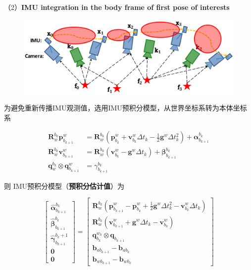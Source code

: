 \documentclass[12pt,a4paper]{article}
\begin{document}
（2）\textbf{IMU integration in the body frame of first pose of interests}

\begin{figure}[htbp]
\centering
\includegraphics[scale=0.6]{images/imu_integration_02.png}
\end{figure}

为避免重新传播IMU观测值，选用IMU预积分模型，从世界坐标系转为本体坐标系

\begin{equation}
\begin{aligned} 
\mathbf{R}_{w}^{b_{k}} \mathbf{p}_{b_{k+1}}^{w} &=
\mathbf{R}_{w}^{b_{k}}\left(\mathbf{p}_{b_{k}}^{w}+\mathbf{v}_{b_{k}}^{w} \Delta t_{k}-\frac{1}{2} \mathbf{g}^{w} \Delta t_{k}^{2}\right)+\boldsymbol{\alpha}_{b_{k+1}}^{b_{k}} \\ 
\mathbf{R}_{w}^{b_{k}} \mathbf{v}_{b_{k+1}}^{w} &=
\mathbf{R}_{w}^{b_{k}}\left(\mathbf{v}_{b_{k}}^{w}-\mathbf{g}^{w} \Delta t_{k}\right)+\boldsymbol{\beta}_{b_{k+1}}^{b_{k}} \\ 
\mathbf{q}_{w}^{b_{k}} \otimes \mathbf{q}_{b_{k+1}}^{w} &=
\gamma_{b_{k+1}}^{b_{k}} 
\end{aligned}
\end{equation}

则 IMU预积分模型（\textbf{预积分估计值}）为

\begin{equation}
\label{equ:preinte_estimate}
\left[\begin{array}{c}
{\hat{\boldsymbol{\alpha}}_{b_{k+1}}^{b_{k}}} \\ 
{\hat{\boldsymbol{\beta}}_{b_{k+1}}^{b_{k}}}  \\ 
{\hat{\boldsymbol{\gamma}}_{b_{k+1}}^{b_{k}+1}} \\ 
{\mathbf{0}} \\ 
{\mathbf{0}}
\end{array}\right]=
\left[\begin{array}{c}
{\mathbf{R}_{w}^{b_{k}}\left(\mathbf{p}_{b_{k+1}}^{w}-\mathbf{p}_{b_{k}}^{w}+\frac{1}{2} \mathbf{g}^{w} \Delta t_{k}^{2}-\mathbf{v}_{b_{k}}^{w} \Delta t_{k}\right)} \\
{\mathbf{R}_{w}^{b_{k}}\left(\mathbf{v}_{b_{k+1}}^{w}+\mathbf{g}^{w} \Delta t_{k}-\mathbf{v}_{b_{k}}^{w}\right)} \\ 
{\mathbf{q}_{b_{k}}^{w_{k}} \otimes \mathbf{q}_{b_{k+1}}} \\ 
{\mathbf{b}_{a b_{k+1}}-\mathbf{b}_{a b_{k}}} \\ 
{\mathbf{b}_{w b_{k+1}}-\mathbf{b}_{w b_{k}}}
\end{array}\right]
\end{equation}
\end{document}
